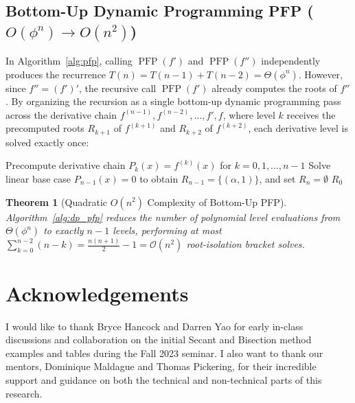 \documentclass{amsart}
\newtheorem{theorem}{Theorem}
\begin{document}
\subsection{Bottom-Up Dynamic Programming PFP ($O(\phi^n) \to O(n^2)$)}

In Algorithm~\ref{alg:pfp}, calling $\operatorname{PFP}(f')$ and $\operatorname{PFP}(f'')$ independently produces the recurrence $T(n) = T(n-1) + T(n-2) = \Theta(\phi^n)$. However, since $f'' = (f')'$, the recursive call $\operatorname{PFP}(f')$ already computes the roots of $f''$. By organizing the recursion as a single bottom-up dynamic programming pass across the derivative chain $f^{(n-1)}, f^{(n-2)}, \dots, f', f$, where level $k$ receives the precomputed roots $R_{k+1}$ of $f^{(k+1)}$ and $R_{k+2}$ of $f^{(k+2)}$, each derivative level is solved exactly once:

\begin{algorithm}[H]
\caption{Bottom-Up Dynamic Programming PFP ($O(n^2)$ Root Isolation)}\label{alg:dp_pfp}
Precompute derivative chain $P_k(x) = f^{(k)}(x)$ for $k = 0, 1, \dots, n-1$\;
Solve linear base case $P_{n-1}(x) = 0$ to obtain $R_{n-1} = \{(\alpha, 1)\}$, and set $R_n = \emptyset$\;
\Return $R_0$\;
\end{algorithm}

\begin{theorem}[Quadratic $O(n^2)$ Complexity of Bottom-Up PFP]
    Algorithm~\ref{alg:dp_pfp} reduces the number of polynomial level evaluations from $\Theta(\phi^n)$ to exactly $n - 1$ levels, performing at most $\sum_{k=0}^{n-2}(n - k) = \frac{n(n+1)}{2} - 1 = \mathcal{O}(n^2)$ root-isolation bracket solves.
\end{theorem}

\section{Acknowledgements}
I would like to thank Bryce Hancock and Darren Yao for early in-class discussions and collaboration on the initial Secant and Bisection method examples and tables during the Fall 2023 seminar. I also want to thank our mentors, Dominique Maldague and Thomas Pickering, for their incredible support and guidance on both the technical and non-technical parts of this research.
\end{document}

